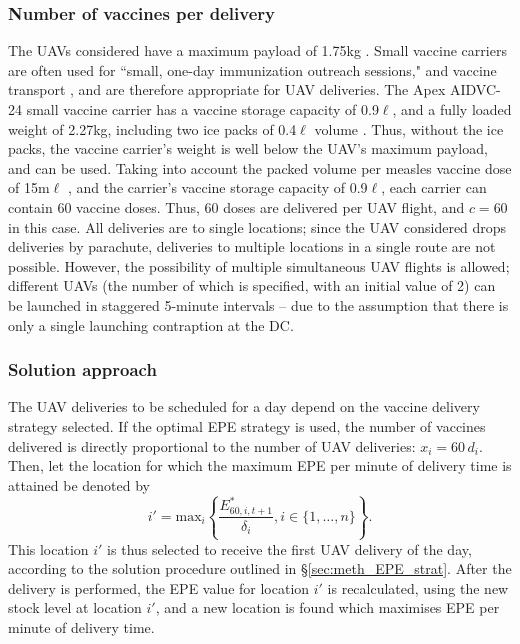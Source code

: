 \subsubsection{Number of vaccines per delivery}
The UAVs considered have a maximum payload of 1.75kg \cite{service_contract_2018, zipline_impact}. Small vaccine carriers are often used for ``small, one-day immunization outreach sessions," and vaccine transport \cite{unicef_Apex}, and are therefore appropriate for UAV deliveries. The Apex AIDVC-24 small vaccine carrier has a vaccine storage capacity of 0.9$\ell$, and a fully loaded weight of 2.27kg, including two ice packs of 0.4$\ell$ volume \cite{who_carriers_2011}. Thus, without the ice packs, the vaccine carrier's weight is well below the UAV's maximum payload, and can be used. Taking into account the packed volume per measles vaccine dose of 15m$\ell$ \cite{cdc_pinkbook_2018}, and the carrier's vaccine storage capacity of 0.9$\ell$, each carrier can contain 60 vaccine doses. Thus, 60 doses are delivered per UAV flight, and $c=60$ in this case. All deliveries are to single locations; since the UAV considered drops deliveries by parachute, deliveries to multiple locations in a single route are not possible. However, the possibility of multiple simultaneous UAV flights is allowed; different UAVs (the number of which is specified, with an initial value of 2) can be launched in staggered 5-minute intervals -- due to the assumption that there is only a single launching contraption at the DC.

\subsubsection{Solution approach}
The UAV deliveries to be scheduled for a day depend on the vaccine delivery strategy selected. 
If the optimal EPE strategy is used, the number of vaccines delivered is directly proportional to the number of UAV deliveries: $x_{i} = 60 \, d_{i}$. Then, let the location for which the maximum EPE per minute of delivery time is attained be denoted by $$i' = \text{max}_{i} \left\{ \frac{E^{*}_{60,i,t+1}}{\delta_{i}}, i \in \{1, \dots, n\} \right\}.$$ 
This location $i'$ is thus selected to receive the first UAV delivery of the day, according to the solution procedure outlined in \S \ref{sec:meth_EPE_strat}. After the delivery is performed, the EPE value for location $i'$ is recalculated, using the new stock level at location $i'$, and a new location is found which maximises EPE per minute of delivery time.

